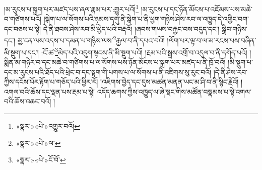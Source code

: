 །མ་རུངས་པ་སྐྲག་པར་མཛད་པས་ཞལ་རྣམ་པར་:གྱུར་པའོ།\footnote{«སྣར་»«པེ་»འགྱུར་བའོ།} །མ་རུངས་པ་དང་ཉོན་མོངས་པ་འཇོམས་པས་མཆེ་བ་གཙིགས་པའོ། །སྒེག་པ་ལ་སོགས་པའི་ཉམས་དགུ་ནི་སྒེག་པ་ནི་ཕྱག་གཉིས་ཤེས་རབ་ལ་འཁྱུད་དེ་འགྱིང་བག་དང་བཅས་པ་སྟེ། དེ་ནི་ཐབས་ཤེས་རབ་མི་ཕྱེད་པའི་བརྡའོ། །ཞབས་གཡས་བརྐྱང་བས་བདུད་དང་། སྒྲིབ་གཉིས་དང་། མྱ་ངན་ལས་འདས་པ་དམན་པ་གཉིས་ལས་\footnote{«སྣར་»«པེ་»ལ་}རྒྱལ་བ་ནི་དཔའ་བའོ། །ལོག་པར་ལྟ་བ་ལ་མ་རངས་པས་བཞིན་མི་སྡུག་པ་དང་། :ངོ་ཚ་\footnote{«སྣར་»«པེ་»ངོ་བོ་}མེད་པའི་འདུག་སྟངས་ནི་མི་སྡུག་པའོ། །རྔམ་པའི་སྒྲས་འགྲོ་བ་འདུལ་བ་ནི་དགོད་པའོ། །སྨིན་མ་གཉེར་བ་དང་མཆེ་བ་གཙིགས་པ་ལ་སོགས་པས་ཉོན་མོངས་པ་སྐྲག་པར་མཛད་པ་ནི་ཁྲོ་བའོ། །མི་སྡུག་པ་དང་མ་རུངས་པའི་ཐོད་པའི་ཕྲེང་བ་དང་སྟག་གི་པགས་པ་ལ་སོགས་པ་ནི་འཇིགས་སུ་རུང་བའོ། །དེ་ནི་ཤེས་རབ་ཀྱིས་དངོས་པོར་རྟོག་པ་གཅོད་པའི་ཕྱིར་རོ། །འཇིགས་བྱེད་དང་དུས་མཚན་མནན་ཡང་མ་ཤི་བ་ནི་སྙིང་རྗེའོ། །འགལ་བའི་ཆོས་དང་ལྡན་པས་རྔམ་པ་སྟེ། འདོད་ཆགས་ཀྱིས་འཁྱུད་ལ་ཞེ་སྡང་གིས་མཚོན་བསྣམས་པ་སྟེ་འགལ་བའི་ཆོས་འཆང་བའོ། །
